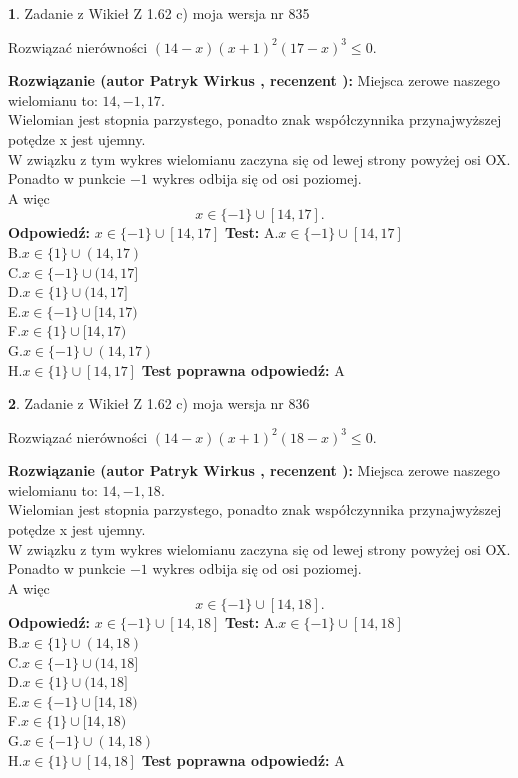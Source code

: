 \documentclass[12pt, a4paper]{article}
\theoremstyle{definition} %
\newtheorem{zad}{}
\newcommand{\zadStart}[1]{\begin{zad}#1\newline}
\newcommand{\zadStop}{\end{zad}}
\newcommand{\rozwStart}[2]{\noindent \textbf{Rozwiązanie (autor #1 , recenzent #2): }\newline}
\newcommand{\rozwStop}{\newline}
\newcommand{\odpStart}{\noindent \textbf{Odpowiedź:}\newline}
\newcommand{\odpStop}{\newline}
\newcommand{\testStart}{\noindent \textbf{Test:}\newline}
\newcommand{\testStop}{\newline}
\newcommand{\kluczStart}{\noindent \textbf{Test poprawna odpowiedź:}\newline}
\newcommand{\kluczStop}{\newline}
\begin{document}
\zadStart{Zadanie z Wikieł Z 1.62 c) moja wersja nr 835}

Rozwiązać nierówności $(14-x)(x+1)^{2}(17-x)^{3}\le0$.
\zadStop
\rozwStart{Patryk Wirkus}{}
Miejsca zerowe naszego wielomianu to: $14, -1, 17$.\\
Wielomian jest stopnia parzystego, ponadto znak współczynnika przy\linebreak najwyższej potędze x jest ujemny.\\ W związku z tym wykres wielomianu zaczyna się od lewej strony powyżej osi OX.\\
Ponadto w punkcie $-1$ wykres odbija się od osi poziomej.\\
A więc $$x \in \{-1\} \cup [14,17].$$
\rozwStop
\odpStart
$x \in \{-1\} \cup [14,17]$
\odpStop
\testStart
A.$x \in \{-1\} \cup [14,17]$\\
B.$x \in \{1\} \cup (14,17)$\\
C.$x \in \{-1\} \cup (14,17]$\\
D.$x \in \{1\} \cup (14,17]$\\
E.$x \in \{-1\} \cup [14,17)$\\
F.$x \in \{1\} \cup [14,17)$\\
G.$x \in \{-1\} \cup (14,17)$\\
H.$x \in \{1\} \cup [14,17]$
\testStop
\kluczStart
A
\kluczStop



\zadStart{Zadanie z Wikieł Z 1.62 c) moja wersja nr 836}

Rozwiązać nierówności $(14-x)(x+1)^{2}(18-x)^{3}\le0$.
\zadStop
\rozwStart{Patryk Wirkus}{}
Miejsca zerowe naszego wielomianu to: $14, -1, 18$.\\
Wielomian jest stopnia parzystego, ponadto znak współczynnika przy\linebreak najwyższej potędze x jest ujemny.\\ W związku z tym wykres wielomianu zaczyna się od lewej strony powyżej osi OX.\\
Ponadto w punkcie $-1$ wykres odbija się od osi poziomej.\\
A więc $$x \in \{-1\} \cup [14,18].$$
\rozwStop
\odpStart
$x \in \{-1\} \cup [14,18]$
\odpStop
\testStart
A.$x \in \{-1\} \cup [14,18]$\\
B.$x \in \{1\} \cup (14,18)$\\
C.$x \in \{-1\} \cup (14,18]$\\
D.$x \in \{1\} \cup (14,18]$\\
E.$x \in \{-1\} \cup [14,18)$\\
F.$x \in \{1\} \cup [14,18)$\\
G.$x \in \{-1\} \cup (14,18)$\\
H.$x \in \{1\} \cup [14,18]$
\testStop
\kluczStart
A
\kluczStop
\end{document}
